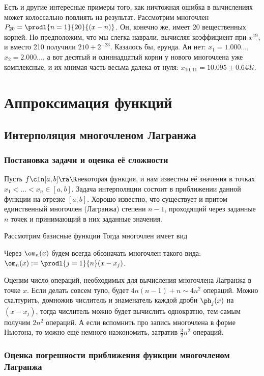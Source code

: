 \documentclass[a4paper]{article}
\begin{document}
Есть и другие интересные примеры того, как ничтожная ошибка в вычислениях может колоссально повлиять на результат.
Рассмотрим многочлен $P_{20} = \prodl{n=1}{20}{(x-n)}$. Он, конечно же, имеет 20 вещественных корней. Но предположим, что
мы слегка наврали, вычисляя коэффициент при $x^{19}$, и вместо 210 получили $210+2^{-23}$. Казалось бы, ерунда. Ан нет:
$x_1 = 1.000\dots$, $x_2 = 2.000\dots$, а вот десятый и одиннадцатый корни у нового многочлена уже комплексные,
и их мнимая часть весьма далека от нуля: $x_{10,11} = 10.095\pm 0.643i$.

\section{Аппроксимация функций}

\subsection{Интерполяция многочленом Лагранжа}

\subsubsection{Постановка задачи и оценка её сложности}

Пусть $f\cln[a,b]\ra \R$\т некоторая функция, и нам известны её значения в точках $x_1<\dots< x_n\in [a,b]$. Задача интерполяции
состоит в приближении данной функции на отрезке $[a,b]$. Хорошо известно, что существует и притом единственный многочлен
(Лагранжа) степени $n-1$, проходящий через заданные $n$ точек и принимающий в них заданные значения.

Рассмотрим базисные функции
Тогда многочлен имеет вид

Через $\om_n(x)$ будем всегда обозначать многочлен такого вида: $\om_n(x) := \prodl{j=1}{n}(x-x_j)$.

Оценим число операций, необходимых для вычисления многочлена Лагранжа в точке $x$. Если делать совсем тупо,
будет $4n(n-1)+n \sim 4 n^2$ операций. Можно схалтурить, домножив числитель и знаменатель каждой дроби $\ph_j(x)$ на
$(x-x_j)$, тогда числитель можно будет вычислить однократно, тем самым получим $2n^2$ операций. А если вспомнить про
запись многочлена в форме Ньютона, то можно ещё немного наэкономить, затратив $\frac32n^2$ операций.

\subsubsection{Оценка погрешности приближения функции многочленом Лагранжа}
\end{document}
